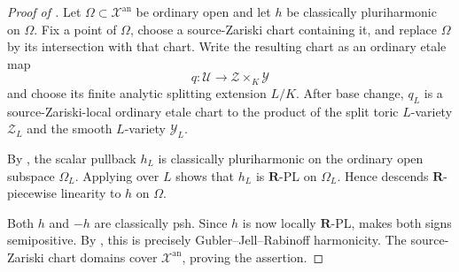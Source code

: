 
\begin{proof}[Proof of
]
Let \(\Omega\subset\mathcal X^{\mathrm{an}}\) be ordinary open and let
\(h\) be classically pluriharmonic on \(\Omega\).  Fix a point of
\(\Omega\), choose a source-Zariski chart containing it, and replace
\(\Omega\) by its intersection with that chart.  Write the resulting chart
as an ordinary etale map
\[
              q:\mathcal U\longrightarrow\mathcal Z\times_K\mathcal Y
\]
and choose its finite analytic splitting extension \(L/K\).  After base
change, \(q_L\) is a source-Zariski-local ordinary etale chart to the
product of the split toric \(L\)-variety \(\mathcal Z_L\) and the smooth
\(L\)-variety \(\mathcal Y_L\).

By \cite[Proposition~7.2(6),(7)]{GR25Classical}, the scalar pullback
\(h_L\) is classically pluriharmonic on the ordinary open subspace
\(\Omega_L\).  Applying
 over \(L\) shows that
\(h_L\) is \(\mathbf R\)-PL on \(\Omega_L\).  Hence
\cite[Corollary~5.12]{GJR26} descends \(\mathbf R\)-piecewise linearity to
\(h\) on \(\Omega\).

Both \(h\) and \(-h\) are classically psh.  Since \(h\) is now locally
\(\mathbf R\)-PL, \cite[Theorem~4.3]{GR25Classical} makes both signs
semipositive.  By \cite[Definition~7.2]{GJR26}, this is precisely
Gubler--Jell--Rabinoff harmonicity.  The source-Zariski chart domains cover
\(\mathcal X^{\mathrm{an}}\), proving the assertion.
\end{proof}

